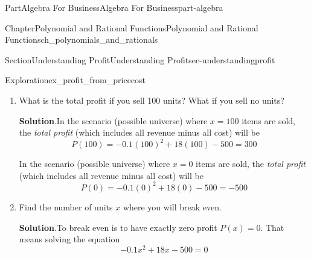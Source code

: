 \documentclass{tufte-book}
\newcommand{\blocktitlefont}{\relax}
\newcommand{\xreffont}{\relax}
\numberwithin{equation}{chapter}
\newcommand{\amp}{&}
\begin{document}
\begin{partptx}{Part}{Algebra For Business}{}{Algebra For Business}{}{}{part-algebra}
\begin{chapterptx}{Chapter}{Polynomial and Rational Functions}{}{Polynomial and Rational Functions}{}{}{ch_polynomials_and_rationals}
\begin{sectionptx}{Section}{Understanding Profit}{}{Understanding Profit}{}{}{sec-understandingprofit}
\begin{exploration}{Exploration}{}{ex_profit_from_pricecost}
\begin{enumerate}[font=\bfseries,label=(\alph*),ref=\alph*]
\begin{equation*}
R(x) = \Big(x\Big) \cdot \Big(-0.1x + 21\Big) = -0.1x^2 + 21x
\end{equation*}
%
\par
To find the total cost, recall our approach from \hyperref[explore_totalcost1]{Exploration~{\xreffont\ref{explore_totalcost1}}}.  If you are going to sell \(x\) items, you must pay a fixed cost of \(500\) dollars, as well as \(3\)\textdollar{} for each item \(x\).  That gives us a total cost function%
\begin{equation*}
C(x) = 500 + 3x
\end{equation*}
%
\par
We can now combine the total revenue and total cost functions to get the profit function.%
\begin{align*}
\text{Profit} \amp = \text{Revenue} - \text{Cost} \\
P(x) \amp = R(x) - C(x) \\
\amp = ( -0.1x^2 + 21x) - (500 + 3x)  \\
\amp = -0.1x^2 + 21x - 500 - 3x\\
P(x) \amp = -0.1x^2 + 18x - 500
\end{align*}
%
\item{}What is the total profit if you sell 100 units?  What if you sell no units?%
\par\smallskip%
\noindent\textbf{\blocktitlefont Solution}.\hypertarget{ex_profit_from_pricecost-4-2}{}\quad{}In the scenario (possible universe) where \(x=100\) items are sold, the \emph{total profit} (which includes all revenue minus all cost) will be%
\begin{equation*}
P(100) =  -0.1 (100)^2 + 18 (100) - 500 = 300
\end{equation*}
%
\par
In the scenario (possible universe) where \(x=0\) items are sold, the \emph{total profit} (which includes all revenue minus all cost) will be%
\begin{equation*}
P(0) =  -0.1 (0)^2 + 18 (0) - 500 = -500
\end{equation*}
%
\item{}Find the number of units \(x\) where you will break even.%
\par\smallskip%
\noindent\textbf{\blocktitlefont Solution}.\hypertarget{ex_profit_from_pricecost-5-2}{}\quad{}To break even is to have exactly zero profit \(P(x)=0\).  That means solving the equation%
\begin{equation*}
-0.1x^2 + 18x - 500 = 0
\end{equation*}

\end{enumerate}
\end{exploration}
\end{sectionptx}
\end{chapterptx}
\end{partptx}
\end{document}
